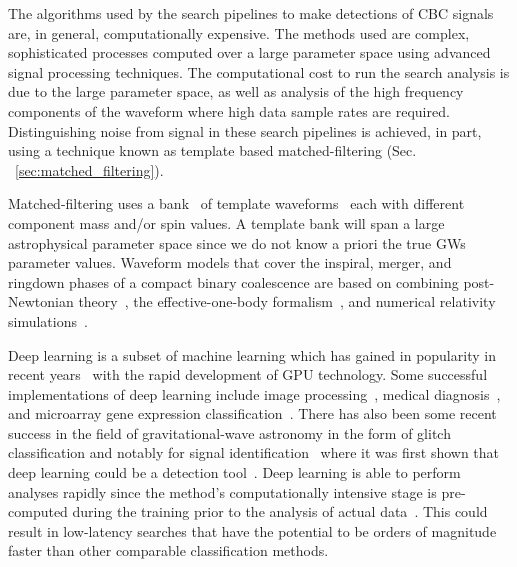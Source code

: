 %
%
The algorithms used by the search pipelines to make
detections of \ac{CBC} signals~\cite{0264-9381-33-21-215004, 0004-637X-748-2-136,PhysRevD.90.082004} are, in general, computationally expensive. The methods used are complex, sophisticated processes computed over a large parameter space using advanced signal processing techniques. The computational cost to run the search analysis is due to the large parameter space, as well as analysis of the high frequency components  of the waveform where high data sample rates are required. Distinguishing noise from signal in these search pipelines is achieved, in part, using a technique known as template based matched-filtering (Sec. ~\ref{sec:matched_filtering}). 

%
%
Matched-filtering uses a bank~\cite{PhysRevD.86.084017,
1705.01845,PhysRevD.80.104014, PhysRevD.90.082004, PhysRevD.89.084041} of template waveforms~\cite{PhysRevD.44.3819, PhysRevD.89.061502,
PhysRevD.89.024003, Blanchet2014} each with different component mass
and/or spin values. A template bank will span a large astrophysical parameter space since we do not know a priori the true \ac{GW}s parameter values. Waveform models that cover the inspiral, merger, and ringdown phases of a compact binary coalescence are based on combining post-Newtonian theory~\cite{PhysRevD.84.049901,PhysRevD.80.084043,Blanchet2014,PhysRevD.93.084054}, the effective-one-body formalism~\cite{PhysRevD.59.084006}, and numerical relativity simulations~\cite{PhysRevLett.95.121101}.

%
%
Deep learning is a subset of machine learning which has gained in popularity in recent years~\cite{NIPS2012_4824, 1406.2661, 1409.1556, 1412.7062, 1311.2901, 1409.4842} with the rapid development of \ac{GPU} technology. Some successful implementations of deep learning include image processing~\cite{1603.08511,1412.2306,NIPS2012_4824}, medical
diagnosis~\cite{KONONENKO200189}, and microarray gene expression
classification~\cite{Pirooznia2008}. There has also been
some recent success in the field of gravitational-wave astronomy in the form of glitch classification \cite{PhysRevD.95.104059,
0264-9381-34-6-064003,1706.07446} and notably for signal
identification~\cite{GEORGE201864,GebKilParHarSch} where it was first shown that deep learning could be a detection tool~\cite{GEORGE201864}. Deep learning is able to %
perform analyses rapidly since the method's computationally intensive
stage is pre-computed during the training prior to the analysis of actual data~\cite{Goodfellow-et-al-2016}. This could result in low-latency searches that have the potential to be orders of magnitude
faster than other comparable classification methods. %

